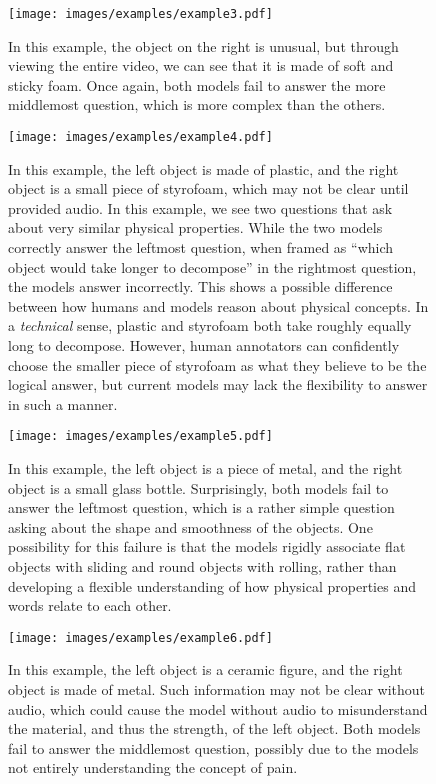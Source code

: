 \documentclass[runningheads]{llncs}
\begin{document}
\begin{figure}[t]
    \centering
  \texttt{[image: images/examples/example3.pdf]}
  \vspace{-5mm}
  \caption{In this example, the object on the right is unusual, but through viewing the entire video, we can see that it is made of soft and sticky foam. Once again, both models fail to answer the more middlemost question, which is more complex than the others.}
  \label{fig:example3}
\end{figure}

\begin{figure}[t]
    \centering
  \texttt{[image: images/examples/example4.pdf]}
  \vspace{-5mm}
  \caption{In this example, the left object is made of plastic, and the right object is a small piece of styrofoam, which may not be clear until provided audio. In this example, we see two questions that ask about very similar physical properties. While the two models correctly answer the leftmost question, when framed as ``which object would take longer to decompose'' in the rightmost question, the models answer incorrectly. This shows a possible difference between how humans and models reason about physical concepts. In a \textit{technical} sense, plastic and styrofoam both take roughly equally long to decompose. However, human annotators can confidently choose the smaller piece of styrofoam as what they believe to be the logical answer, but current models may lack the flexibility to answer in such a manner.}
  \label{fig:example4}
\end{figure}

\begin{figure}[t]
    \centering
  \texttt{[image: images/examples/example5.pdf]}
  \vspace{-3mm}
  \caption{In this example, the left object is a piece of metal, and the right object is a small glass bottle. Surprisingly, both models fail to answer the leftmost question, which is a rather simple question asking about the shape and smoothness of the objects. One possibility for this failure is that the models rigidly associate flat objects with sliding and round objects with rolling, rather than developing a flexible understanding of how physical properties and words relate to each other. }
  \label{fig:example5}
\end{figure}

\begin{figure}[t]
    \centering
  \texttt{[image: images/examples/example6.pdf]}
  \vspace{-3mm}
  \caption{In this example, the left object is a ceramic figure, and the right object is made of metal. Such information may not be clear without audio, which could cause the model without audio to misunderstand the material, and thus the strength, of the left object. Both models fail to answer the middlemost question, possibly due to the models not entirely understanding the concept of pain.}
  \label{fig:example6}
\end{figure}
\end{document}
